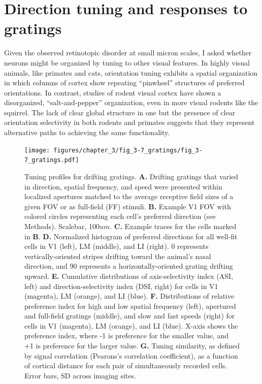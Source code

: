 \section{Direction tuning and responses to gratings}
Given the observed retinotopic disorder at small micron scales, I asked whether neurons might be organized by tuning to other visual features. In highly visual animals, like primates and cats, orientation tuning exhibits a spatial organization in which columns of cortex show repeating ``pinwheel'' structures of preferred orientations. In contrast, studies of rodent visual cortex have shown a disorganized, ``salt-and-pepper'' organization\cite{Ohki2005}, even in more visual rodents like the squirrel\cite{VanHooser2005}. The lack of clear global structure in one but the presence of clear orientation selectivity in both rodents and primates suggests that they represent alternative paths to achieving the same functionality.

\begin{figure}[t!]
    \texttt{[image: figures/chapter\_3/fig\_3-7\_gratings/fig\_3-7\_gratings.pdf]}
    \vspace{.1in}
    \caption[Responses to drifting gratings]{Tuning profiles for drifting gratings.
    \textbf{A.} Drifting gratings that varied in direction, spatial frequency, and speed were presented within localized apertures matched to the average receptive field sizes of a given FOV or as full-field (FF) stimuli.
    \textbf{B.} Example V1 FOV with colored circles representing each cell's preferred direction (see Methods). Scalebar, 100$um$.
    \textbf{C.} Example traces for the cells marked in \textbf{B}. 
    \textbf{D.} Normalized histogram of preferred directions for all well-fit cells in V1 (left), LM (middle), and LI (right). 0 represents vertically-oriented stripes drifting toward the animal's nasal direction, and 90 represents a horizontally-oriented grating drifting upward.
    \textbf{E.} Cumulative distributions of axis-selectivity index (ASI, left) and direction-selectivity index (DSI, right) for cells in V1 (magenta), LM (orange), and LI (blue).
    \textbf{F.} Distributions of relative preference index for high and low spatial frequency (left), apertured and full-field gratings (middle), and slow and fast speeds (right) for cells in V1 (magenta), LM (orange), and LI (blue). X-axis shows the preference index, where -1 is preference for the smaller value, and +1 is preference for the larger value.
    \textbf{G.} Tuning similarity, as defined by signal correlation (Pearons's correlation coefficient), as a function of cortical distance for each pair of simultaneously recorded cells. Error bars, SD across imaging sites.  
    \label{fig:gratings}}
\end{figure}

